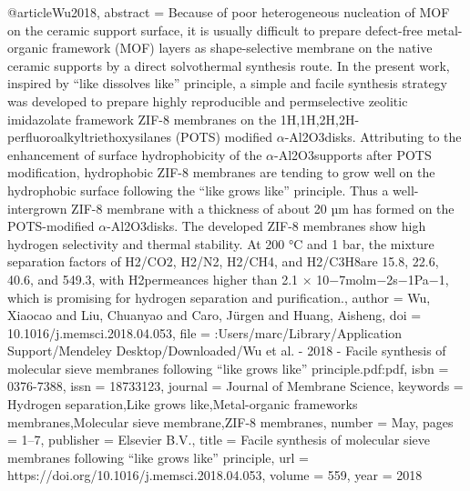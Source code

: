 @article{Wu2018,
abstract = {Because of poor heterogeneous nucleation of MOF on the ceramic support surface, it is usually difficult to prepare defect-free metal-organic framework (MOF) layers as shape-selective membrane on the native ceramic supports by a direct solvothermal synthesis route. In the present work, inspired by “like dissolves like” principle, a simple and facile synthesis strategy was developed to prepare highly reproducible and permselective zeolitic imidazolate framework ZIF-8 membranes on the 1H,1H,2H,2H-perfluoroalkyltriethoxysilanes (POTS) modified $\alpha$-Al2O3disks. Attributing to the enhancement of surface hydrophobicity of the $\alpha$-Al2O3supports after POTS modification, hydrophobic ZIF-8 membranes are tending to grow well on the hydrophobic surface following the “like grows like” principle. Thus a well-intergrown ZIF-8 membrane with a thickness of about 20 µm has formed on the POTS-modified $\alpha$-Al2O3disks. The developed ZIF-8 membranes show high hydrogen selectivity and thermal stability. At 200 °C and 1 bar, the mixture separation factors of H2/CO2, H2/N2, H2/CH4, and H2/C3H8are 15.8, 22.6, 40.6, and 549.3, with H2permeances higher than 2.1 × 10−7mol{\textperiodcentered}m−2{\textperiodcentered}s−1{\textperiodcentered}Pa−1, which is promising for hydrogen separation and purification.},
author = {Wu, Xiaocao and Liu, Chuanyao and Caro, J{\"{u}}rgen and Huang, Aisheng},
doi = {10.1016/j.memsci.2018.04.053},
file = {:Users/marc/Library/Application Support/Mendeley Desktop/Downloaded/Wu et al. - 2018 - Facile synthesis of molecular sieve membranes following “like grows like” principle.pdf:pdf},
isbn = {0376-7388},
issn = {18733123},
journal = {Journal of Membrane Science},
keywords = {Hydrogen separation,Like grows like,Metal-organic frameworks membranes,Molecular sieve membrane,ZIF-8 membranes},
number = {May},
pages = {1--7},
publisher = {Elsevier B.V.},
title = {{Facile synthesis of molecular sieve membranes following “like grows like” principle}},
url = {https://doi.org/10.1016/j.memsci.2018.04.053},
volume = {559},
year = {2018}
}
